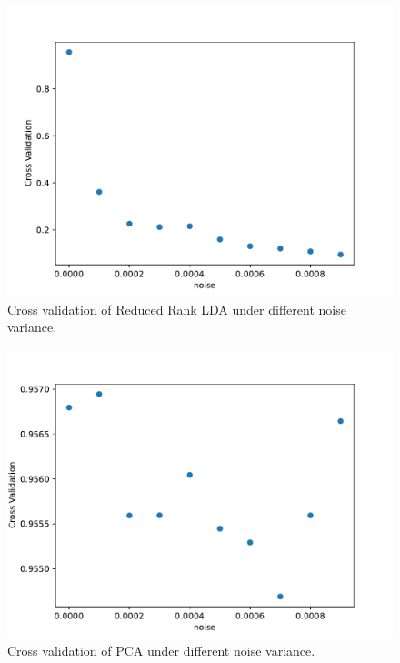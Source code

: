 \begin{figure}
    \centering
    \includegraphics[width=0.7\linewidth]{figures/rrlda_lda_cv_noise.pdf}
    \caption{Cross validation of Reduced Rank LDA under different noise variance.}
    \label{fig:rrlda_lda_cv_noise}
\end{figure}

\begin{figure}
    \centering
    \includegraphics[width=0.7\linewidth]{figures/pca_lda_cv_noise.pdf}
    \caption{Cross validation of PCA under different noise variance.}
    \label{fig:pca_lda_cv_noise}
\end{figure}

